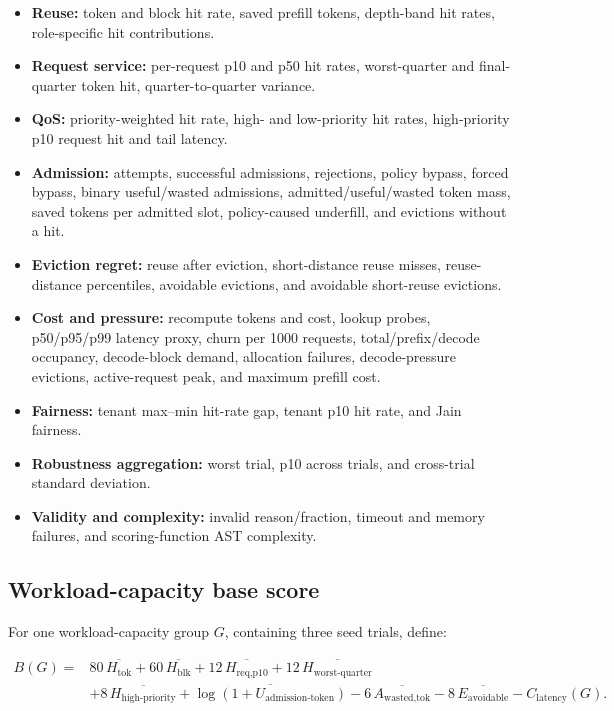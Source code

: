 \documentclass[11pt]{article}
\begin{document}
\begin{itemize}
  \item \textbf{Reuse:} token and block hit rate, saved prefill tokens, depth-band hit
  rates, role-specific hit contributions.
  \item \textbf{Request service:} per-request p10 and p50 hit rates, worst-quarter and
  final-quarter token hit, quarter-to-quarter variance.
  \item \textbf{QoS:} priority-weighted hit rate, high- and low-priority hit rates,
  high-priority p10 request hit and tail latency.
  \item \textbf{Admission:} attempts, successful admissions, rejections, policy bypass,
  forced bypass, binary useful/wasted admissions, admitted/useful/wasted token mass,
  saved tokens per admitted slot, policy-caused underfill, and evictions without a hit.
  \item \textbf{Eviction regret:} reuse after eviction, short-distance reuse misses,
  reuse-distance percentiles, avoidable evictions, and avoidable short-reuse
  evictions.
  \item \textbf{Cost and pressure:} recompute tokens and cost, lookup probes, p50/p95/p99
  latency proxy, churn per 1000 requests, total/prefix/decode occupancy, decode-block
  demand, allocation failures, decode-pressure evictions, active-request peak, and
  maximum prefill cost.
  \item \textbf{Fairness:} tenant max--min hit-rate gap, tenant p10 hit rate, and Jain
  fairness.
  \item \textbf{Robustness aggregation:} worst trial, p10 across trials, and
  cross-trial standard deviation.
  \item \textbf{Validity and complexity:} invalid reason/fraction, timeout and memory
  failures, and scoring-function AST complexity.
\end{itemize}

\subsection{Workload-capacity base score}

For one workload-capacity group \(G\), containing three seed trials, define:

\begin{align}
  B(G) ={}&
  80\,\overline{H_{\text{tok}}}
  +60\,\overline{H_{\text{blk}}}
  +12\,\overline{H_{\text{req,p10}}}
  +12\,\overline{H_{\text{worst-quarter}}} \nonumber\\
  &+8\,\overline{H_{\text{high-priority}}}
  +\overline{\log(1+U_{\text{admission-token}})}
  -6\,\overline{A_{\text{wasted,tok}}}
  -8\,\overline{E_{\text{avoidable}}}
  -C_{\text{latency}}(G).
\end{align}
\end{document}
